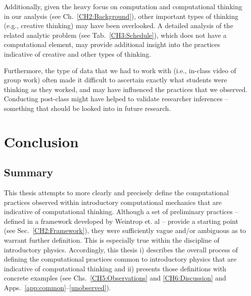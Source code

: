 \documentclass{msuphddissertation}
\begin{document}
\begin{doublespace}
Additionally, given the heavy focus on computation and computational thinking in our analysis (see Ch.~\ref{CH2:Background}), other important types of thinking (e.g., creative thinking) may have been overlooked.  A detailed analysis of the related analytic problem (see Tab.~\ref{CH3:Schedule}), which does not have a computational element, may provide additional insight into the practices indicative of creative and other types of thinking.

Furthermore, the type of data that we had to work with (i.e., in-class video of group work) often made it difficult to ascertain exactly what students were thinking as they worked, and may have influenced the practices that we observed.  Conducting post-class might have helped to validate researcher inferences -- something that should be looked into in future research.



\chapter{Conclusion}\label{CH7:Conclusion}

\section{Summary}

This thesis attempts to more clearly and precisely define the computational practices observed within introductory computational mechanics that are indicative of computational thinking.  Although a set of preliminary practices -- defined in a framework developed by Weintrop et. al -- provide a starting point (see Sec.~\ref{CH2:Framework}), they were sufficiently vague and/or ambiguous as to warrant further definition.  This is especially true within the discipline of introductory physics.  Accordingly, this thesis i) describes the overall process of defining the computational practices common to introductory physics that are indicative of computational thinking and ii) presents those definitions with concrete examples (see Chs.~\ref{CH5:Observations} and \ref{CH6:Discussion} and Apps.~\ref{app:common}--\ref{unobserved}).


\end{doublespace}
\end{document}
